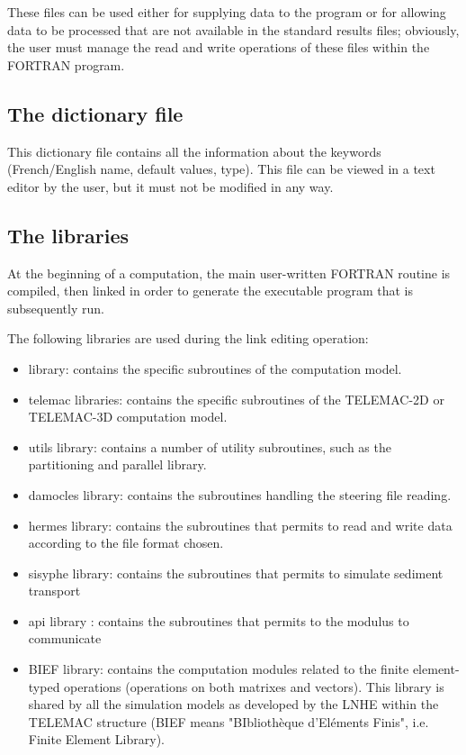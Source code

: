  These files can be used either for supplying data to the program or for allowing data to be processed that are not available in the standard results files; obviously, the user must manage the read and write operations of these files within the FORTRAN program.


\subsection{ The dictionary file}

 This dictionary file contains all the information about the keywords (French/English name, default values, type). This file can be viewed in a text editor by the user, but it must not be modified in any way.


\subsection{ The libraries}

 At the beginning of a computation, the main user-written FORTRAN routine is compiled, then linked in order to generate the executable program that is subsequently run.

 The following libraries are used during the link editing operation:

\begin{itemize}
\item  \tomawac library: contains the specific subroutines of the \tomawac computation model.

\item  telemac libraries: contains the specific subroutines of the TELEMAC-2D or TELEMAC-3D computation model.

\item  utils library: contains a number of utility subroutines, such as the partitioning and parallel library.

\item  damocles library: contains the subroutines handling the steering file reading.

\item  hermes library: contains the subroutines that permits to read and write data according to the file format chosen.

\item  sisyphe library: contains the subroutines that permits to simulate sediment transport

\item  api library : contains the subroutines that permits to the modulus to communicate

\item  BIEF library: contains the computation modules related to the finite element-typed operations (operations on both matrixes and vectors). This library is shared by all the simulation models as developed by the LNHE within the TELEMAC structure (BIEF means "BIbliothèque d'Eléments Finis", i.e. Finite Element Library).
\end{itemize}


